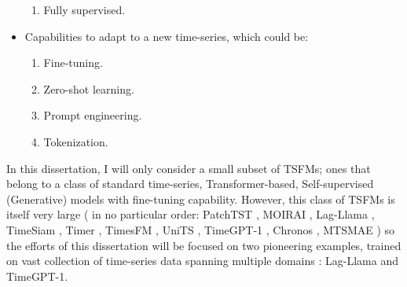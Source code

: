 \begin{itemize}
\begin{enumerate}
        \item Fully supervised.
    \end{enumerate}
    \item Capabilities to adapt to a new time-series, which could be:
    \begin{enumerate}
        \item Fine-tuning.
        \item Zero-shot learning.
        \item Prompt engineering.
        \item Tokenization.
    \end{enumerate}
\end{itemize}

In this dissertation, I will only consider a small subset of TSFMs; ones that belong to a class of standard time-series, Transformer-based, Self-supervised (Generative) models with fine-tuning capability. However, this class of TSFMs is itself very large \cite{liang2024foundation} ( in no particular order: PatchTST \cite{nie2022time}, MOIRAI \cite{woo2024unified}, Lag-Llama \cite{rasul2023lag}, TimeSiam \cite{dong2024timesiam}, Timer \cite{liu2024timer}, TimesFM \cite{das2023decoder}, UniTS \cite{gao2024units}, TimeGPT-1 \cite{garza2023timegpt}, Chronos \cite{ansari2024chronos}, MTSMAE \cite{tang2022mtsmae}) so the efforts of this dissertation will be focused on two pioneering examples, trained on vast collection of time-series data spanning multiple domains \cite{liang2024foundation}: Lag-Llama and TimeGPT-1.



